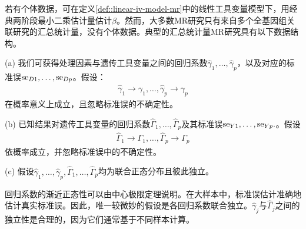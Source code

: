 若有个体数据，可在定义\ref{def::linear-iv-model-mr}中的线性工具变量模型下，用经典两阶段最小二乘估计量估计$\beta$。然而，大多数MR研究只有来自多个全基因组关联研究的汇总统计量，没有个体数据。典型的汇总统计量MR研究具有以下数据结构。


\begin{assumption}
[基于汇总统计量的孟德尔随机化研究]\label{assume::MR-summary}
(a)
我们可获得处理因素与遗传工具变量之间的回归系数$\hat{\gamma}_1   , \ldots, \hat{\gamma}_p$，以及对应的标准误$\textup{se}_{D1}, \ldots, \textup{se}_{Dp}$。假设：
\begin{eqnarray}
\label{eq::small-gammas}
\hat{\gamma}_1  \rightarrow \gamma_1 , \ldots, \hat{\gamma}_p \rightarrow \gamma_p
\end{eqnarray}
在概率意义上成立，且忽略标准误的不确定性。 

(b) 已知结果对遗传工具变量的回归系数$\hat{\Gamma}_1   , \ldots, \hat{\Gamma}_p$及其标准误$\textup{se}_{Y1}, \ldots, \textup{se}_{Yp}.$。假设\begin{eqnarray}
\label{eq::big-gammas}
\hat{\Gamma}_1 \rightarrow \Gamma_1 , \ldots, \hat{\Gamma}_p \rightarrow \Gamma_p
\end{eqnarray}依概率成立，并忽略标准误中的不确定性。  

(c)
假设$\hat{\gamma}_1   , \ldots, \hat{\gamma}_p, \hat{\Gamma}_1   , \ldots, \hat{\Gamma}_p$均为联合正态分布且彼此独立。
\end{assumption}



回归系数的渐近正态性可以由中心极限定理说明。在大样本中，标准误估计准确地估计真实标准误。因此，唯一较微妙的假设是各回归系数联合独立。$\hat{\gamma}_j$与$\hat{\Gamma}_j$之间的独立性是合理的，因为它们通常基于不同样本计算。 

